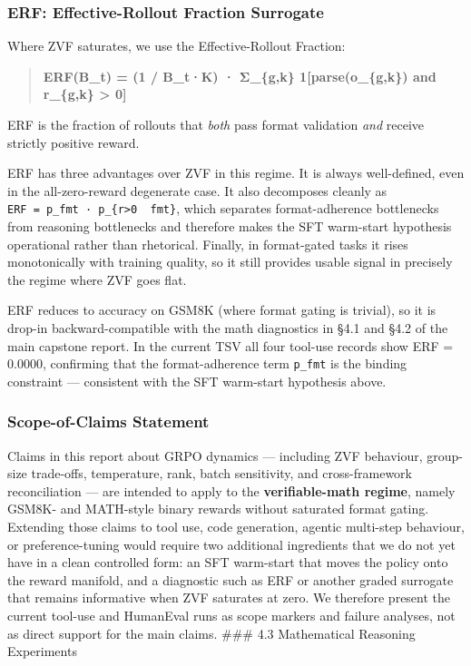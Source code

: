 \documentclass[
  american,
  11pt,
  a4paper,
  oneside]{report}
\begin{document}
\subsubsection{ERF: Effective-Rollout Fraction
Surrogate}\label{erf-effective-rollout-fraction-surrogate}

Where ZVF saturates, we use the Effective-Rollout Fraction:

\begin{quote}
\textbf{ERF(B\_t) = (1 / \textbar B\_t\textbar·K) · Σ\_\{g,k\}
1{[}parse(o\_\{g,k\}) and r\_\{g,k\} \textgreater{} 0{]}}
\end{quote}

ERF is the fraction of rollouts that \emph{both} pass format validation
\emph{and} receive strictly positive reward.

ERF has three advantages over ZVF in this regime. It is always
well-defined, even in the all-zero-reward degenerate case. It also
decomposes cleanly as
\texttt{ERF\ =\ p\_fmt\ ·\ p\_\{r\textgreater{}0\ \textbar{}\ fmt\}},
which separates format-adherence bottlenecks from reasoning bottlenecks
and therefore makes the SFT warm-start hypothesis operational rather
than rhetorical. Finally, in format-gated tasks it rises monotonically
with training quality, so it still provides usable signal in precisely
the regime where ZVF goes flat.

ERF reduces to accuracy on GSM8K (where format gating is trivial), so it
is drop-in backward-compatible with the math diagnostics in §4.1 and
§4.2 of the main capstone report. In the current TSV all four tool-use
records show ERF = 0.0000, confirming that the format-adherence term
\texttt{p\_fmt} is the binding constraint --- consistent with the SFT
warm-start hypothesis above.

\subsubsection{Scope-of-Claims
Statement}\label{scope-of-claims-statement}

Claims in this report about GRPO dynamics --- including ZVF behaviour,
group-size trade-offs, temperature, rank, batch sensitivity, and
cross-framework reconciliation --- are intended to apply to the
\textbf{verifiable-math regime}, namely GSM8K- and MATH-style binary
rewards without saturated format gating. Extending those claims to tool
use, code generation, agentic multi-step behaviour, or preference-tuning
would require two additional ingredients that we do not yet have in a
clean controlled form: an SFT warm-start that moves the policy onto the
reward manifold, and a diagnostic such as ERF or another graded
surrogate that remains informative when ZVF saturates at zero. We
therefore present the current tool-use and HumanEval runs as scope
markers and failure analyses, not as direct support for the main claims.
\#\#\# 4.3 Mathematical Reasoning Experiments
\end{document}
